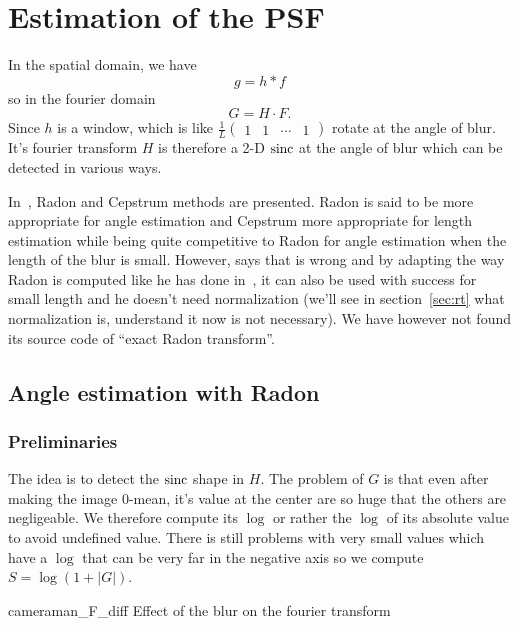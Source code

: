 \section{Estimation of the PSF}
In the spatial domain, we have
\[ g = h * f \]
so in the fourier domain
\[ G = H \cdot F. \]
Since $h$ is a window, which is like
$\frac{1}{L}
\begin{pmatrix}
  1 & 1 & \cdots & 1
\end{pmatrix}$ rotate at the angle of blur.
It's fourier transform $H$ is therefore
a 2-D $\operatorname{sinc}$ at the angle of blur
which can be detected in various ways.

In~\cite{krahmer2006blind},
Radon and Cepstrum methods are presented.
Radon is said to be more appropriate for angle
estimation and Cepstrum more appropriate for length
estimation while being quite competitive to Radon
for angle estimation when the length of the blur
is small.
However, \cite{oliveira2007blind} says that
\cite{krahmer2006blind} is wrong and by adapting
the way Radon is computed like he has done
in~\cite{oliveira2006implementation},
it can also be used with success for small length and
he doesn't need normalization
(we'll see in section~\ref{sec:rt} what
normalization is,
understand it now is not necessary).
We have however not found its source code of
``exact Radon transform''.

\subsection{Angle estimation with Radon}
\subsubsection{Preliminaries}
The idea is to detect the $\operatorname{sinc}$ shape in $H$.
The problem of $G$ is that even
after making the image 0-mean,
it's value at the center are so huge that the others
are negligeable.
We therefore compute its $\log$ or rather the $\log$
of its absolute value to avoid undefined value.
There is still problems with very small values which
have a $\log$ that can be very far in the negative axis
so we compute $S = \log(1 + |G|)$.

\begin{myfig}{cameraman_F_diff}
  {Effect of the blur on the fourier transform}
\end{myfig}


